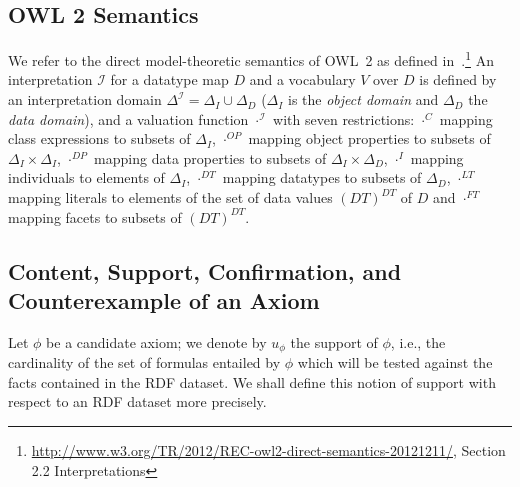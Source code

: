 \documentclass{sig-alternate}
\begin{document}
\subsection{ OWL 2 Semantics}
We refer to the direct model-theoretic semantics of OWL~2 as defined in~\cite{OWL2-direct-semantics}.\footnote{\url{http://www.w3.org/TR/2012/REC-owl2-direct-semantics-20121211/}, Section 2.2 Interpretations}
An interpretation $\mathcal{I}$ for a datatype map $D$ and a vocabulary $V$ over $D$ is defined by an interpretation domain $\Delta^\mathcal{I}=\Delta_{I}\cup\Delta_{D}$  ($\Delta_{I}$ is the \textit{object domain} and $\Delta_{D}$ the \textit{data domain}), and a valuation function $\cdot^{\mathcal{I}}$ with seven restrictions: $\cdot^{C}$ mapping class expressions to subsets of $\Delta_{I}$,  $\cdot^{OP}$ mapping object properties to subsets of $\Delta_{I}\times\Delta_{I}$, $\cdot^{DP}$ mapping data properties to subsets of $\Delta_{I}\times\Delta_{D}$, $\cdot^{I}$ mapping individuals to elements of $\Delta_{I}$, $\cdot^{DT}$ mapping datatypes to subsets of $\Delta_{D}$, $\cdot^{LT}$ mapping literals to elements of the set of data values $(DT)^{DT}$ of $D$ and $\cdot^{FT}$ mapping facets to subsets of $(DT)^{DT}$.

\subsection{Content, Support, Confirmation, and Counterexample of an Axiom}
 
Let $\phi$ be a candidate axiom; we denote by $u_\phi$ the support of $\phi$,
i.e., the cardinality of the set of formulas entailed by $\phi$ which will be tested
against the facts contained in the RDF dataset.
We shall define this notion of support with respect to an RDF dataset more precisely.

\end{document}

